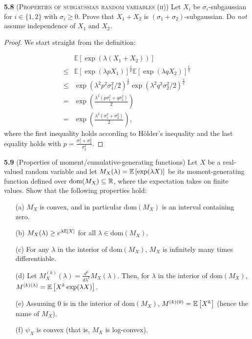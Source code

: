 \noindent\textbf{5.8}
(\textsc{Properties of subgaussian random variables (ii)})
Let $X_{i}$ be $\sigma_i$-subgaussian for $i \in\{1,2\}$ with $\sigma_i \geq 0$.
Prove that $X_{1}+X_{2}$ is $(\sigma_1 + \sigma_2)$-subgaussian.
Do \textit{not} assume independence of $X_1$ and $X_2$.

\begin{proof}
	We start straight from the definition:

	\begin{equation*}
	\begin{aligned}
	&\mathbb{E}[\exp(\lambda(X_{1}+X_{2}))]\\
	\leq &\mathbb{E}[\exp(\lambda p X_{1})]^\frac{1}{p} \mathbb{E}[\exp(\lambda q X_{2})]^\frac{1}{q}\\
	\leq &\exp(\lambda^2 p^2 \sigma_1^2 / 2)^\frac{1}{p} \exp(\lambda^2 q^2 \sigma_2^2 / 2)^\frac{1}{q}\\
	= &\exp(\frac{\lambda^2(p \sigma_1^2 + q \sigma_2^2)}{2})\\
	= &\exp(\frac{\lambda^2(\sigma_1^2 + \sigma_2^2)}{2}),
	\end{aligned}
	\end{equation*}
	where the first inequality holds according to Hölder's inequality and the last equality holds with $p = \frac{\sigma_1^2 + \sigma_2^2}{\sigma_2^2}$.
\end{proof}

\noindent\textbf{5.9}
(Properties of moment/cumulative-generating functions) Let $X$ be a real-valued random variable and let $M_X(\lambda) = \mathbb{E} \left[\exp(\lambda X)\right]$ be its moment-generating function defined over $\text{dom}(M_X) \subseteq \mathbb{R}$, where the expectation takes on finite values. Show that the following properties hold:
\begin{enumerate}
	\item[(a)] $M_X$ is convex, and in particular $\text{dom}(M_X)$ is an interval containing zero.
	\item[(b)] $M_X(\lambda) \ge e^{\lambda \mathbb{E} \left[X\right]}$ for all $\lambda \in \text{dom}(M_X)$.
	\item[(c)] For any $\lambda$ in the interior of $\text{dom}(M_X)$, $M_X$ is infinitely many times differentiable.
	\item[(d)] Let $M^{(k)}_X(\lambda) = \frac{d^k}{d\lambda^k}M_X(\lambda)$. Then, for $\lambda$ in the interior of $\text{dom}(M_X)$, $M^{(k)(\lambda)} = \mathbb{E} \left[X^k \exp(\lambda X)\right]$. 
	\item[(e)] Assuming $0$ is in the interior of $\text{dom}(M_X)$, $M^{(k)(0)} = \mathbb{E} \left[X^k\right]$ (hence the name of $M_X$).
	\item[(f)] $\psi_X$ is convex (that is, $M_X$ is log-convex). 
\end{enumerate}

